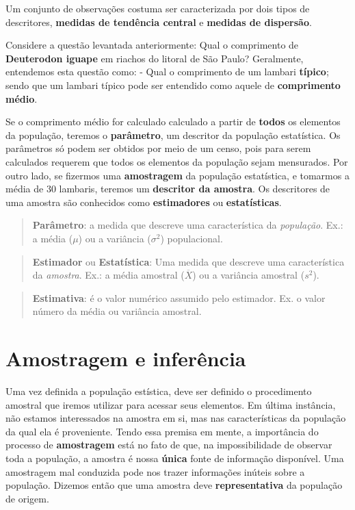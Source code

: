 \documentclass[
]{book}
\begin{document}
Um conjunto de observações costuma ser caracterizada por dois tipos de descritores, \textbf{medidas de tendência central} e \textbf{medidas de dispersão}.

Considere a questão levantada anteriormente: Qual o comprimento de \textbf{Deuterodon iguape} em riachos do litoral de São Paulo? Geralmente, entendemos esta questão como: - Qual o comprimento de um lambari \textbf{típico}; sendo que um lambari típico pode ser entendido como aquele de \textbf{comprimento médio}.

Se o comprimento médio for calculado calculado a partir de \textbf{todos} os elementos da população, teremos o \textbf{parâmetro}, um descritor da população estatística. Os parâmetros só podem ser obtidos por meio de um censo, pois para serem calculados requerem que todos os elementos da população sejam mensurados. Por outro lado, se fizermos uma \textbf{amostragem} da população estatística, e tomarmos a média de 30 lambaris, teremos um \textbf{descritor da amostra}. Os descritores de uma amostra são conhecidos como \textbf{estimadores} ou \textbf{estatísticas}.

\begin{quote}
\textbf{Parâmetro}: a medida que descreve uma característica da \textit{população}. Ex.: a média (\(\mu\)) ou a variância (\(\sigma^2\)) populacional.
\end{quote}

\begin{quote}
\textbf{Estimador} ou \textbf{Estatística}: Uma medida que descreve uma característica da \textit{amostra}. Ex.: a média amostral (\(\overline{X}\)) ou a variância amostral (\(s^2\)).
\end{quote}

\begin{quote}
\textbf{Estimativa}: é o valor numérico assumido pelo estimador. Ex. o valor número da média ou variância amostral.
\end{quote}

\hypertarget{amostragem-e-inferuxeancia}{%
\section{Amostragem e inferência}\label{amostragem-e-inferuxeancia}}

Uma vez definida a população estística, deve ser definido o procedimento amostral que iremos utilizar para acessar seus elementos. Em última instância, não estamos interessados na amostra em si, mas nas características da população da qual ela é proveniente. Tendo essa premisa em mente, a importância do processo de \textbf{amostragem} está no fato de que, na impossibilidade de observar toda a população, a amostra é nossa \textbf{única} fonte de informação disponível. Uma amostragem mal conduzida pode nos trazer informações inúteis sobre a população. Dizemos então que uma amostra deve \textbf{representativa} da população de origem.
\end{document}
